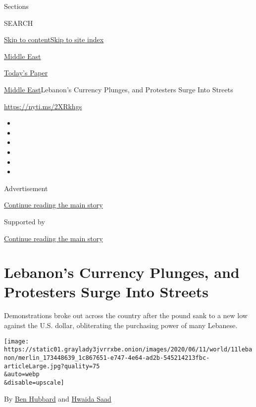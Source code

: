 Sections

SEARCH

\protect\hyperlink{site-content}{Skip to
content}\protect\hyperlink{site-index}{Skip to site index}

\href{https://www.nytimes3xbfgragh.onion/section/world/middleeast}{Middle
East}

\href{https://myaccount.nytimes3xbfgragh.onion/auth/login?response_type=cookie\&client_id=vi}{}

\href{https://www.nytimes3xbfgragh.onion/section/todayspaper}{Today's
Paper}

\href{/section/world/middleeast}{Middle East}\textbar{}Lebanon's
Currency Plunges, and Protesters Surge Into Streets

\url{https://nyti.ms/2XRkhgs}

\begin{itemize}
\item
\item
\item
\item
\item
\item
\end{itemize}

Advertisement

\protect\hyperlink{after-top}{Continue reading the main story}

Supported by

\protect\hyperlink{after-sponsor}{Continue reading the main story}

\hypertarget{lebanons-currency-plunges-and-protesters-surge-into-streets}{%
\section{Lebanon's Currency Plunges, and Protesters Surge Into
Streets}\label{lebanons-currency-plunges-and-protesters-surge-into-streets}}

Demonstrations broke out across the country after the pound sank to a
new low against the U.S. dollar, obliterating the purchasing power of
many Lebanese.

\texttt{[image: https://static01.graylady3jvrrxbe.onion/images/2020/06/11/world/11lebanon/merlin\_173448639\_1c867651-e747-4e64-ad2b-545214213fbc-articleLarge.jpg?quality=75\\\&auto=webp\\\&disable=upscale]}

By \href{https://www.nytimes3xbfgragh.onion/by/ben-hubbard}{Ben Hubbard}
and \href{https://www.nytimes3xbfgragh.onion/by/hwaida-saad}{Hwaida
Saad}

